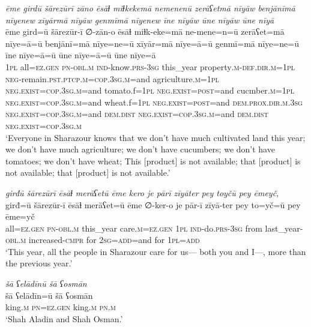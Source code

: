 \ea \label{PM.37}
\textit{ēme girdū šārezūrī zāno ēsāɫ miɫkekemā nemenenū zerāʕetmā nīyāw benjānīmā nīyenew xīyārmā nīyāw genmīmā nīyenew īne nīyāw ūne nīyāw ūne nīyā} \\ 
\gll ēme gird=ū šārezūr-ī ∅-zān-o ēsāɫ miɫk-eke=mā ne-mene=n=ū zerāʕet=mā nīye=ā=ū benjānī=mā nīye=ne=ū xīyār=mā nīye=ā=ū genmī=mā nīye=ne=ū īne nīye=ā=ū ūne nīye=ā=ū ūne nīye=ā \\ 
 \textsc{1pl} all\textsc{\textsc{=ez.gen}} \textsc{pn}\textsc{-obl}\textsc{.m} \textsc{ind-}know\textsc{.prs}\textsc{-3sg} this\_year property\textsc{.m}\textsc{-def}\textsc{.dir}\textsc{.m}\textsc{=1pl} \textsc{neg-}remain\textsc{.pst}\textsc{.ptcp}\textsc{.m}\textsc{=cop}\textsc{.3sg}\textsc{.m}=and agriculture\textsc{.m}\textsc{=1pl} \textsc{\textsc{neg.}exist}\textsc{=cop}\textsc{.3sg}\textsc{.m}=and tomato.f\textsc{=1pl} \textsc{\textsc{neg.}exist}\textsc{=\textsc{post}}=and cucmber\textsc{.m}\textsc{=1pl} \textsc{\textsc{neg.}exist}\textsc{=cop}\textsc{.3sg}\textsc{.m}=and wheat.f\textsc{=1pl} \textsc{\textsc{neg.}exist}\textsc{=\textsc{post}}=and \textsc{dem.prox}\textsc{.dir}\textsc{.m}\textsc{.3sg} \textsc{\textsc{neg.}exist}\textsc{=cop}\textsc{.3sg}\textsc{.m}=and \textsc{dem.dist} \textsc{\textsc{neg.}exist}\textsc{=cop}\textsc{.3sg}\textsc{.m}=and \textsc{dem.dist} \textsc{\textsc{neg.}exist}\textsc{=cop}\textsc{.3sg}\textsc{.m} \\ 
\glt `Everyone in Sharazour knows that we don’t have much cultivated land this year; we don’t have much agriculture; we don’t have cucumbers; we don’t have tomatoes; we don’t have wheat; This [product] is not available; that [product] is not available; that [product] is not available.'
\z 
 
\ea \label{PM.38}
\textit{girđū šārezūrī ēsāɫ merāʕetū ēme kero je pārī zīyāter pey toyčū pey ēmeyč,} \\ 
\gll girđ=ū šārezūr-ī ēsāɫ merāʕet=ū ēme ∅-ker-o je pār-ī zīyā-ter pey to=yč=ū pey ēme=yč \\ 
 all\textsc{\textsc{=ez.gen}} \textsc{pn}\textsc{-obl}\textsc{.m} this\_year care\textsc{.m}\textsc{\textsc{=ez.gen}} \textsc{1pl} \textsc{ind-}do\textsc{.prs}\textsc{-3sg} from last\_year\textsc{-obl}\textsc{.m} increased\textsc{-cmpr} for \textsc{2sg}\textsc{=add}=and for \textsc{1pl}\textsc{=add} \\ 
\glt `This year, all the people in Sharazour care for us— both you and I—, more than the previous year.'
\z 
 
 \ea \label{DG.1}
\textit{šā ʕelādīnū šā ʕosmān} \\ 
\gll šā ʕelādīn=ū šā ʕosmān \\ 
 king\textsc{.m} \textsc{pn}\textsc{=ez}\textsc{.gen} king\textsc{.m} \textsc{pn}\textsc{.m} \\ 
\glt `Shah Aladin and Shah Osman.'
\z 
 
